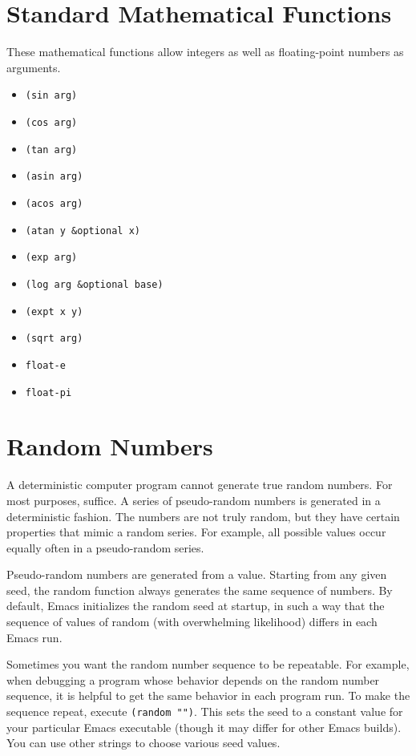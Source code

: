 \section{Standard Mathematical Functions}
\label{sec:stand-math-funct}

These mathematical functions allow integers as well as floating-point numbers as arguments.
\begin{itemize}
\item \lstinline|(sin arg)|
\item \lstinline|(cos arg)|
\item \lstinline|(tan arg)|
\item \lstinline|(asin arg)|
\item \lstinline|(acos arg)|
\item \lstinline|(atan y &optional x)|
\item \lstinline|(exp arg)|
\item \lstinline|(log arg &optional base)|
\item \lstinline|(expt x y)|
\item \lstinline|(sqrt arg)|
\item \lstinline|float-e|
\item \lstinline|float-pi|
\end{itemize}

\section{Random Numbers}
\label{sec:random-numbers}

A deterministic computer program cannot generate true random numbers.
For most purposes,  suffice.
A series of pseudo-random numbers is generated in a deterministic fashion.
The numbers are not truly random, but they have certain properties that mimic a random series.
For example, all possible values occur equally often in a pseudo-random series.



Pseudo-random numbers are generated from a  value.
Starting from any given seed, the random function always generates the same sequence of numbers.
By default, Emacs initializes the random seed at startup, in such a way that the sequence of values of random (with overwhelming likelihood) differs in each Emacs run.


Sometimes you want the random number sequence to be repeatable.
For example, when debugging a program whose behavior depends on the random number sequence, it is helpful to get the same behavior in each program run.
To make the sequence repeat, execute \lstinline|(random "")|.
This sets the seed to a constant value for your particular Emacs executable (though it may differ for other Emacs builds).
You can use other strings to choose various seed values.


